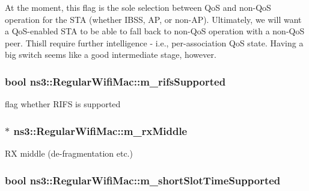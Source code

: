 At the moment, this flag is the sole selection between QoS and non-\/\+QoS operation for the S\+TA (whether I\+B\+SS, AP, or non-\/\+AP). Ultimately, we will want a Qo\+S-\/enabled S\+TA to be able to fall back to non-\/\+QoS operation with a non-\/\+QoS peer. This\textquotesingle{}ll require further intelligence -\/ i.\+e., per-\/association QoS state. Having a big switch seems like a good intermediate stage, however. 
\subsubsection[{\texorpdfstring{m\+\_\+rifs\+Supported}{m_rifsSupported}}]{\setlength{\rightskip}{0pt plus 5cm}bool ns3\+::\+Regular\+Wifi\+Mac\+::m\+\_\+rifs\+Supported\hspace{0.3cm}{\ttfamily [private]}}\hypertarget{classns3_1_1RegularWifiMac_a7fd4928adf45086e8c122afd2382e91b}{}\label{classns3_1_1RegularWifiMac_a7fd4928adf45086e8c122afd2382e91b}


flag whether R\+I\+FS is supported 

\subsubsection[{\texorpdfstring{m\+\_\+rx\+Middle}{m_rxMiddle}}]{$\ast$ ns3\+::\+Regular\+Wifi\+Mac\+::m\+\_\+rx\+Middle\hspace{0.3cm}{\ttfamily [protected]}}\hypertarget{classns3_1_1RegularWifiMac_a053ee6c09ab4809655bdeb82531c8c13}{}\label{classns3_1_1RegularWifiMac_a053ee6c09ab4809655bdeb82531c8c13}


RX middle (de-\/fragmentation etc.) 

\subsubsection[{\texorpdfstring{m\+\_\+short\+Slot\+Time\+Supported}{m_shortSlotTimeSupported}}]{\setlength{\rightskip}{0pt plus 5cm}bool ns3\+::\+Regular\+Wifi\+Mac\+::m\+\_\+short\+Slot\+Time\+Supported\hspace{0.3cm}{\ttfamily [private]}}\hypertarget{classns3_1_1RegularWifiMac_ace05e98c5a79252c9be5fe676dd8b9a2}{}\label{classns3_1_1RegularWifiMac_ace05e98c5a79252c9be5fe676dd8b9a2}


